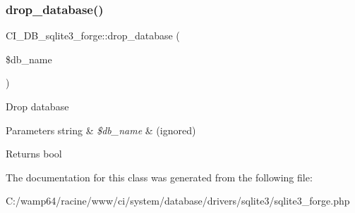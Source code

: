 \subsubsection{\texorpdfstring{drop\+\_\+database()}{drop\_database()}}
{\footnotesize\ttfamily C\+I\+\_\+\+D\+B\+\_\+sqlite3\+\_\+forge\+::drop\+\_\+database (\begin{DoxyParamCaption}\item[{}]{\$db\+\_\+name }\end{DoxyParamCaption})}

Drop database


\begin{DoxyParams}[1]{Parameters}
string & {\em \$db\+\_\+name} & (ignored) \\
\hline
\end{DoxyParams}
\begin{DoxyReturn}{Returns}
bool 
\end{DoxyReturn}


The documentation for this class was generated from the following file\+:\begin{DoxyCompactItemize}
\item 
C\+:/wamp64/racine/www/ci/system/database/drivers/sqlite3/sqlite3\+\_\+forge.\+php\end{DoxyCompactItemize}
